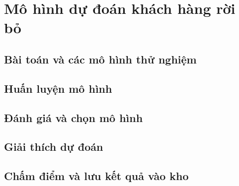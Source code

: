 \section{Mô hình dự đoán khách hàng rời bỏ}
\subsection{Bài toán và các mô hình thử nghiệm}
\subsection{Huấn luyện mô hình}
\subsection{Đánh giá và chọn mô hình}
\subsection{Giải thích dự đoán}
\subsection{Chấm điểm và lưu kết quả vào kho}
